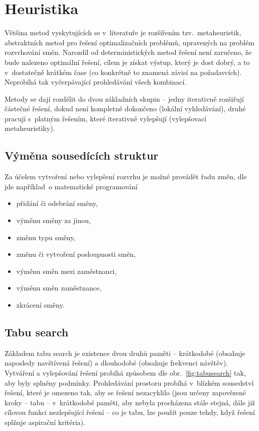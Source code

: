 \documentclass[twoside]{ctuthesis}
\begin{document}
\section{Heuristika}

Většina metod vyskytujících se v~literatuře je rozšířením tzv.~metaheuristik, abstraktních metod pro řešení optimalizačních problémů, upravených na problém rozvrhování směn. Narozdíl od deterministických metod řešení není zaručeno, že bude nalezeno optimální řešení, cílem je získat výstup, který je dost dobrý, a to v~dostatečně krátkém čase (co konkrétně to znamená závisí na požadavcích). Neprobíhá tak vyčerpávající prohledávání všech kombinací. \cite{glover2015metaheuristics}

Metody se dají rozdělit do dvou základních skupin -- jedny iterativně rozšiřují částečné řešení, dokud není kompletně dokončeno (lokální vyhledávání), druhé pracují s~platným řešením, které iterativně vylepšují (vylepšovací metaheuristiky). \cite{van2013personnel}

\subsection{Výměna sousedících struktur}
Za účelem vytvoření nebo vylepšení rozvrhu je možné provádět řadu změn, dle \cite{kletzander2020solving} jde například~o matematické programování
\begin{itemize}
	\item přidání či odebrání směny,
	\item výměnu směny za jinou,
	\item změnu typu směny,
	\item změnu či vytvoření posloupnosti směn,
	\item výměnu směn mezi zaměstnanci,
	\item výměnu směn zaměstnance,
	\item zkrácení směny.
\end{itemize}


\subsection{Tabu search}
Základem tabu search je existence dvou druhů paměti – krátkodobé (obsahuje naposledy navštívená řešení) a dlouhodobé (obsahuje frekvenci návštěv). \cite{liang2020optimization} Vytváření a vylepšování řešení probíhá způsobem dle obr.~\ref{fig:tabusearch} tak, aby byly splněny podmínky. Prohledávání prostoru probíhá v~blízkém sousedství řešení, které je omezeno tak, aby se řešení nezacyklilo (jsou určeny zapovězené kroky -- tabu -- v~krátkodobé paměti, aby nebyla procházena stále stejná, dále již cílovou funkci nezlepšující řešení -- co je tabu, lze použít pouze tehdy, když řešení splňuje aspirační kritéria).  \cite{glover1990tabu}
\end{document}
